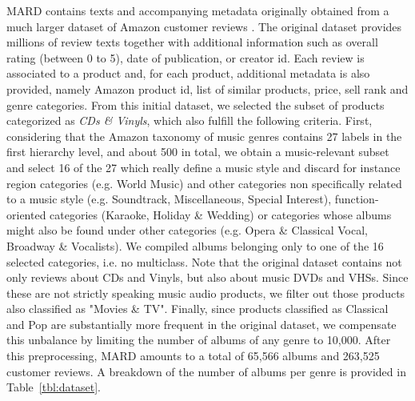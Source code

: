 MARD contains texts and accompanying metadata originally obtained from a much larger dataset of Amazon customer reviews \cite{McAuley2015a,McAuley2015}. The original dataset provides millions of review texts together with additional information such as overall rating (between 0 to 5), date of publication, or creator id. Each review is associated to a product and, for each product, additional metadata is also provided, namely Amazon product id, list of similar products, price, sell rank and genre categories. From this initial dataset, we selected the subset of products categorized as \textit{CDs \& Vinyls}, which also fulfill the following criteria. First, considering that the Amazon taxonomy of music genres contains 27 labels in the first hierarchy level, and about 500 in total, we obtain a music-relevant subset and select 16 of the 27 which really define a music style and discard for instance region categories (e.g. World Music) and other categories non specifically related to a music style (e.g. Soundtrack, Miscellaneous, Special Interest), function-oriented categories (Karaoke, Holiday \& Wedding) or categories whose albums might also be found under other categories (e.g. Opera \& Classical Vocal, Broadway \& Vocalists). We compiled albums belonging only to one of the 16 selected categories, i.e. no multiclass. Note that the original dataset contains not only reviews about CDs and Vinyls, but also about music DVDs and VHSs. Since these are not strictly speaking music audio products, we filter out those products also classified as "Movies \& TV". Finally, since products classified as Classical and Pop are substantially more frequent in the original dataset, we compensate this unbalance by limiting the number of albums of any genre to 10,000. After this preprocessing, MARD amounts to a total of 65,566 albums and 263,525 customer reviews. A breakdown of the number of albums per genre is provided in Table~\ref{tbl:dataset}.

